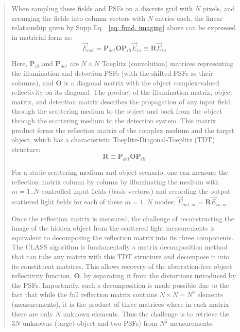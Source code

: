 \documentclass[12pt]{article}
\newenvironment{ourresponse}
    {\begin{tcolorbox}[width=\linewidth,breakable,enhanced,colback=gray!5,colframe=responsecolor!50,title=Response,left=5pt,right=5pt]}
    {\end{tcolorbox}}
\begin{document}
\begin{ourresponse}
\begin{quote}

When sampling these fields and PSFs on a discrete grid with $N$ pixels, and arranging the fields into column vectors with $N$ entries each, the linear relationship given by Supp.Eq. ~\ref{eq: fund. imaging} above can be expressed in matricial form as:
\begin{equation}
\vec{E}_{out} = \mathbf{P}_{det} \mathbf{O} \mathbf{P}_{ill} \vec{E}_{in} \equiv \mathbf{R} \vec{E}_{in} 
\end{equation}


Here, $\mathbf{P}_{ill}$ and $\mathbf{P}_{det}$ are $N \times N$ Toeplitz (convolution) matrices representing the illumination and detection PSFs (with the shifted PSFs as their columns), and $\mathbf{O}$ is a diagonal matrix with the object complex-valued reflectivity on its diagonal. The product of the illumination matrix, object matrix, and detection matrix describes the propagation of any input field through the scattering medium to the object and back from the object through the scattering medium to the detection system. This matrix product forms the reflection matrix of the complex medium and the target object, which has a characteristic Toeplitz-Diagonal-Toeplitz (TDT) structure:
\begin{equation}
    \mathbf{R} \equiv \mathbf{P}_{det} \mathbf{O} \mathbf{P}_{ill}
    \label{eq: ref.matrix definition}
\end{equation}


For a static scattering medium and object scenario, one can measure the reflection matrix column by column by illuminating the medium with $m=1..N$ controlled input fields (basis vectors,) and recording the output scattered light fields for each of these $m=1..N$ modes: $\vec{E}_{out,m} =  \mathbf{R} \vec{E}_{in,m} $.

Once the reflection matrix is measured, the challenge of reconstructing the image of the hidden object from the scattered light measurements is equivalent to decomposing the reflection matrix into its three components. 
The CLASS algorithm \cite{choi2022flexible} is fundamentally a matrix decomposition method that can take any matrix with this TDT structure and decompose it into its constituent matrices. This allows recovery of the aberration-free object reflectivity function, $\mathbf{O}$, by separating it from the distortions introduced by the PSFs. 
Importantly, such a decomposition is made possible due to the fact that while the full reflection matrix contains $N\times N = N^2$ elements (measurements), it is the product of three matrices where in each matrix there are only $N$ unknown elements. Thus the challenge is to retrieve the $3N$ unknowns (target object and two PSFs) from $N^2$ measurements.


\end{quote}
\end{ourresponse}
\end{document}

